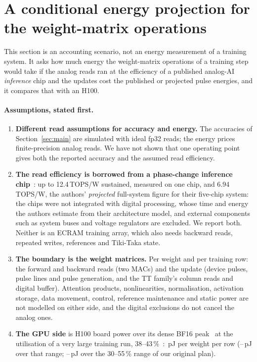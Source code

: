 \section{A conditional energy projection for the weight-matrix operations}\label{sec:energy}
This section is an accounting scenario, not an energy measurement of a training system. It asks how much energy the
weight-matrix operations of a training step would take if the analog reads ran at the efficiency of a published analog-AI
\emph{inference} chip and the updates cost the published or projected pulse energies, and it compares that with an H100.

\paragraph{Assumptions, stated first.}
\begin{enumerate}
\item \textbf{Different read assumptions for accuracy and energy.} The accuracies of Section~\ref{sec:main} are simulated with
      ideal fp32 reads; the energy prices finite-precision analog reads. We have not shown that one operating point gives both
      the reported accuracy and the assumed read efficiency.
\item \textbf{The read efficiency is borrowed from a phase-change inference chip}~\cite{ambrogio2023}: up to 12.4\,TOPS/W
      sustained, measured on one chip, and 6.94\,TOPS/W, the authors' \emph{projected} full-system figure for their five-chip
      system: the chips were not integrated with digital processing, whose time and energy the authors estimate from their
      architecture model, and external components such as system buses and voltage regulators are excluded. We report both. Neither is an ECRAM training array, which also needs
      backward reads, repeated writes, references and Tiki-Taka state.
\item \textbf{The boundary is the weight matrices.} Per weight and per training row: the forward and backward reads (two MACs)
      and the update (device pulses, pulse lines and pulse generation, and the TT family's column reads and digital buffer).
      Attention products, nonlinearities, normalisation, activation storage, data movement, control, reference maintenance and
      static power are not modelled on either side, and the digital exclusions do not cancel the analog ones.
\item \textbf{The GPU side} is H100 board power over its dense BF16 peak~\cite{nvidiah100} at the utilisation of a very large
      training run, 38--43\,\%~\cite{dubey2024}: \RVenGpuPj\,pJ per weight per row (\RVenGpuMeasLo--\RVenGpuMeasHi\,pJ over that
      range; \RVenGpuPlannedLo--\RVenGpuPlannedHi\,pJ over the 30--55\,\% range of our original plan).
\end{enumerate}

